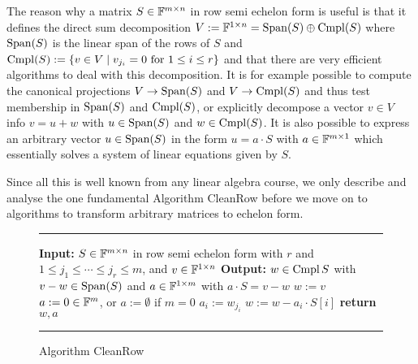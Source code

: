 The reason why a matrix $S \in \mathbb{F}^{m \times n}$ in row semi echelon     
form is useful is that it defines the direct sum decomposition          
$V := \F^{1 \times n} = \Span(S) \oplus \Cmpl(S)$ where $\Span(S)$
is the linear span of the rows of $S$
and $\Cmpl(S) := \left\{ v \in V \mid v_{j_i} = 0 \mbox{ for } 1 \le i \le r
\right\}$ and that there are very efficient
algorithms to deal with this decomposition. It is for example possible
to compute the canonical projections $V \to \Span(S)$ and 
$V \to \Cmpl(S)$ and thus
test membership in $\Span(S)$ and $\Cmpl(S)$, or explicitly decompose a 
vector $v \in V$
info $v=u+w$ with $u \in \Span(S)$ and $w \in \Cmpl(S)$. It is also possible to
express an arbitrary vector $u \in \Span(S)$ in the form $u = a\cdot S$ with
$a \in \mathbb{F}^{m \times 1}$ which essentially solves a system of linear
equations given by $S$.

Since all this is well known from any linear algebra course, we only 
describe and analyse the one fundamental Algorithm \textsf{CleanRow}
before we move on to algorithms to transform arbitrary matrices to
echelon form.

\begin{figure}[ht]
\hrule
\vspace*{1mm}
\begin{algorithmic}
\STATE \textbf{Input:} $S \in \mathbb{F}^{m \times n}$ in
row semi echelon form with $r$ and $1 \le j_1 \le \cdots \le j_r \le m$,
and $v \in \mathbb{F}^{1 \times n}$
\STATE \textbf{Output:} $w \in \Cmpl{S}$ with $v-w \in
\Span(S)$ and $a \in \mathbb{F}^{1 \times m}$ with $a\cdot S = v-w$
\vspace*{1mm}
\STATE $w := v$
\STATE $a := 0 \in \mathbb{F}^m$, or $a:=\emptyset$ if $m=0$ \hspace*{2.4mm}
    \STATE $a_i := w_{j_i}$
    \STATE $w := w - a_i \cdot S[i]$
    \hspace*{2cm} 
\ENDFOR\hspace*{4.2cm}
\STATE \textbf{return} $w,a$
\end{algorithmic}
\vspace*{1mm}
\hrule
\caption{Algorithm \textsf{CleanRow}}
\label{AlgCleanRow}
\end{figure}

